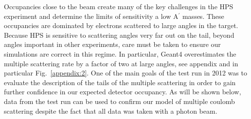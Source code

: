 Occupancies close to the beam create many of the key challenges in the HPS experiment
and determine the limits of sensitivity a low A$^\prime$ masses.
These occupancies are dominated by electrons scattered to large angles 
in the target. Because HPS is sensitive to scattering angles very far out 
on the tail, beyond angles important in other experiments, care must be taken
to ensure our simulations are correct in this regime.  In particular,
Geant4 overestimates the multiple scattering rate by a factor of two at large angles, see appendix and in particular Fig.~\ref{appendix:2}.
One of the main goals of the test run in 2012 was to evaluate the description of the tails of the multiple scattering in order 
to gain further confidence in our expected detector occupancy. As will be shown below, data from the 
test run can be used to confirm our model of multiple coulomb scattering despite the fact that 
all data was taken with a photon beam.



